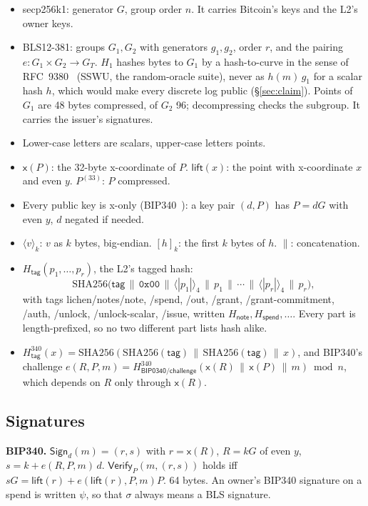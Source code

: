 \documentclass[11pt]{article}
\theoremstyle{plain}
\theoremstyle{definition}
\newcommand{\be}[2]{\langle #1\rangle_{#2}}
\newcommand{\pre}[2]{[#1]_{#2}}
\newcommand{\xo}[1]{\mathsf{x}(#1)}
\newcommand{\Ht}[1]{H_{\textsf{#1}}}
\newcommand{\Hb}[1]{H^{340}_{\textsf{#1}}}
\newcommand{\Sign}{\mathsf{Sign}}
\newcommand{\Vfy}{\mathsf{Verify}}
\newcommand{\Hg}{H_{1}}
\begin{document}
\begin{itemize}[nosep]
\item secp256k1: generator $G$, group order $n$. It carries Bitcoin's
  keys and the L2's owner keys.
\item BLS12-381: groups $G_1, G_2$ with generators $g_1, g_2$, order $r$,
  and the pairing $e: G_1 \times G_2 \to G_T$. $\Hg$ hashes bytes to
  $G_1$ by a hash-to-curve in the sense of RFC~9380~\cite{rfc9380}
  (SSWU, the random-oracle suite), never as $h(m)\,g_1$
  for a scalar hash $h$, which would make every discrete log public
  (\S\ref{sec:claim}). Points of $G_1$ are 48 bytes compressed, of
  $G_2$ 96; decompressing checks the subgroup. It carries the issuer's
  signatures.
\item Lower-case letters are scalars, upper-case letters points.
\item $\xo{P}$: the 32-byte x-coordinate of $P$. $\mathsf{lift}(x)$: the
  point with x-coordinate $x$ and even $y$. $P^{(33)}$: $P$ compressed.
\item Every public key is x-only (BIP340~\cite{bip340}): a key pair $(d,
  P)$ has $P = dG$ with even $y$, $d$ negated if needed.
\item $\be{v}{k}$: $v$ as $k$ bytes, big-endian. $\pre{h}{k}$: the first
  $k$ bytes of $h$. $\|$: concatenation.
\item $\Ht{tag}(p_1, \dots, p_r)$, the L2's tagged hash:
  \[
    \mathrm{SHA256}\big(\textsf{tag} \,\|\, \texttt{0x00} \,\|\, \be{|p_1|}{4}
    \,\|\, p_1 \,\|\, \cdots \,\|\, \be{|p_r|}{4} \,\|\, p_r\big),
  \]
  with tags \textsf{lichen/notes/note}, \textsf{/spend}, \textsf{/out},
  \textsf{/grant}, \textsf{/grant-commitment}, \textsf{/auth},
  \textsf{/unlock}, \textsf{/unlock-scalar}, \textsf{/issue}, written
  $\Ht{note}, \Ht{spend}, \dots$. Every part is length-prefixed, so no
  two different part lists hash alike.
\item $\Hb{tag}(x) = \mathrm{SHA256}(\mathrm{SHA256}(\textsf{tag}) \,\|\,
  \mathrm{SHA256}(\textsf{tag}) \,\|\, x)$, and BIP340's challenge $e(R,
  P, m) = \Hb{BIP0340/challenge}(\xo{R} \,\|\, \xo{P} \,\|\, m) \bmod n$,
  which depends on $R$ only through $\xo{R}$.
\end{itemize}

\subsection{Signatures}

\textbf{BIP340.} $\Sign_d(m) = (r, s)$ with $r = \xo{R}$, $R = kG$ of
even $y$, $s = k + e(R, P, m)\,d$. $\Vfy_P(m, (r, s))$ holds iff $sG =
\mathsf{lift}(r) + e(\mathsf{lift}(r), P, m)P$. 64 bytes. An owner's
BIP340 signature on a spend is written $\psi$, so that $\sigma$ always
means a BLS signature.
\end{document}
